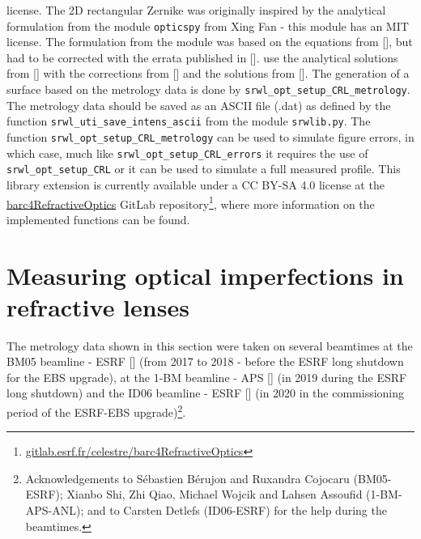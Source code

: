 \begin{refsection}
{license. The 2D rectangular Zernike was originally inspired by the analytical formulation from the module \texttt{opticspy} from Xing Fan - this module has an MIT license. The formulation from the module was based on the equations from [\cite{Mahajan2007}], but had to be corrected with the errata published in [\cite{Mahajan2012}].} use the analytical solutions from [\cite{Mahajan2007}] with the corrections from [\cite{Mahajan2012}] and the solutions from [\cite{Mahajan2010}].  The generation of a surface based on the metrology data is done by \texttt{srwl\_opt\_setup\_CRL\_metrology}. The metrology data should be saved as an ASCII file (.dat) as defined by the function \texttt{srwl\_uti\_save\_intens\_ascii} from the module \texttt{srwlib.py}. The function \texttt{srwl\_opt\_setup\_CRL\_metrology} can be used to simulate figure errors, in which case, much like \texttt{srwl\_opt\_setup\_CRL\_errors} it requires the use of \texttt{srwl\_opt\_setup\_CRL} or it can be used to simulate a full measured profile. This library extension is currently available under a CC BY-SA 4.0 license at the \href{https://gitlab.esrf.fr/celestre/barc4RefractiveOptics}{barc4RefractiveOptics} GitLab repository\footnote{\url{gitlab.esrf.fr/celestre/barc4RefractiveOptics}}, where more information on the implemented functions can be found.

\section{Measuring optical imperfections in refractive lenses}

The metrology data shown in this section were taken on several beamtimes at the BM05 beamline - ESRF [\cite{Ziegler2004}] (from 2017 to 2018 - before the ESRF long shutdown for the EBS upgrade), at the 1-BM beamline - APS [\cite{Macrander2016}] (in 2019 during the ESRF long shutdown) and the ID06 beamline - ESRF [\cite{Kutsal_2019}] (in 2020 in the commissioning period of the ESRF-EBS upgrade)\footnote{Acknowledgements to Sébastien Bérujon and Ruxandra Cojocaru (BM05-ESRF); Xianbo Shi, Zhi Qiao, Michael Wojcik and Lahsen Assoufid (1-BM-APS-ANL); and to Carsten Detlefs (ID06-ESRF) for the help during the beamtimes.}.



\end{refsection}
